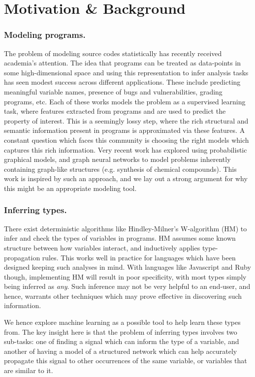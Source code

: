 \section{Motivation \& Background}
\label{sec:motivation}

\subsubsection{Modeling programs.} The problem of modeling source codes statistically has recently received academia's attention. The idea that programs can be treated as data-points in some high-dimensional space and using this representation to infer analysis tasks has seen modest success across different applications. These include predicting meaningful variable names, presence of bugs and vulnerabilities, grading programs, etc. Each of these works models the problem as a supervised learning task, where features extracted from programs and are used to predict the property of interest. This is a seemingly lossy step, where the rich structural and semantic information present in programs is approximated via these features. A constant question which faces this community is choosing the right models which captures this rich information. Very recent work has explored using probabilistic graphical models, and graph neural networks to model problems inherently containing graph-like structures (e.g. synthesis of chemical compounds). This work is inspired by such an approach, and we lay out a strong argument for why this might be an appropriate modeling tool.

\subsubsection{Inferring types.}
There exist deterministic algorithms like Hindley-Milner's W-algorithm (HM) to infer and check the types of variables in programs. HM assumes some known structure between how variables interact, and inductively applies type-propagation rules. This works well in practice for languages which have been designed keeping such analyses in mind. With languages like Javascript and Ruby though, implementing HM will result in poor specificity, with most types simply being inferred as \textit{any}. Such inference may not be very helpful to an end-user, and hence, warrants other techniques which may prove effective in discovering such information. 

We hence explore machine learning as a possible tool to help learn these types from. The key insight here is that the problem of inferring types involves two sub-tasks: one of finding a signal which can inform the type of a variable, and another of having a model of a structured network which can help accurately propagate this signal to other occurrences of the same variable, or variables that are similar to it. 


